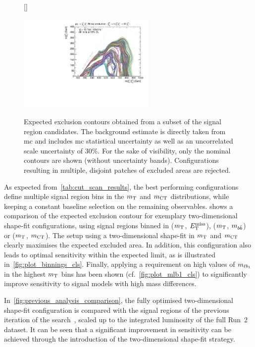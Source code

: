 \begin{figure}
[\FBwidth]
{\caption{Expected exclusion contours obtained from a subset of the signal region candidates. The background estimate is directly taken from \gls{mc} and includes \gls{mc} statistical uncertainty as well as an uncorrelated scale uncertainty of 30\%. For the sake of visibility, only the nominal contours are shown (without uncertainty bands). Configurations resulting in multiple, disjoint patches of excluded areas are rejected.}\label{fig:fit_scan_optimisation}}
{\includegraphics[width=0.60\textwidth]{HF/batch_compare}}
\end{figure}

As expected from~\cref{tab:cut_scan_results}, the best performing configurations define multiple signal region bins in the $m_{\textrm{T}}$ and $m_{\textrm{CT}}$ distributions, while keeping a constant baseline selection on the remaining observables.
 shows a comparison of the expected exclusion contour for exemplary two-dimensional shape-fit configurations, using signal regions binned in ($m_{\textrm{T}}$, $E_{\textrm{T}}^{\textrm{miss}}$), ($m_{\textrm{T}}$, $m_{b\bar{b}}$) or ($m_{\textrm{T}}$, $m_{\textrm{CT}}$).
The setup using a two-dimensional shape-fit in $m_{\textrm{T}}$ and $m_{\textrm{CT}}$ clearly maximises the expected excluded area.
In addition, this configuration also leads to optimal sensitivity within the expected limit, as is illustrated in~\cref{fig:plot_binnings_cls}.
Finally, applying a requirement on high values of $m_{\ell b_{1}}$ in the highest $m_{\textrm{T}}$ bins has been shown (cf.~\cref{fig:plot_mlb1_cls}) to significantly improve sensitivity to signal models with high mass differences. 

In~\cref{fig:previous_analysis_comparison}, the fully optimised two-dimensional shape-fit configuration is compared with the signal regions of the previous iteration of the search~\cite{SUSY-2017-01}, scaled up to the integrated luminosity of the full Run~2 dataset.
It can be seen that a significant improvement in sensitivity can be achieved through the introduction of the two-dimensional shape-fit strategy.

